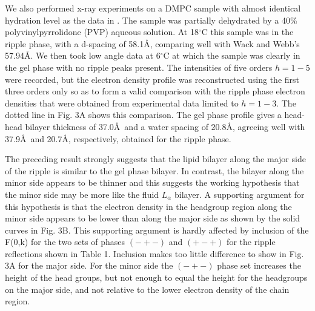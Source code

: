 We also performed x-ray experiments on a DMPC sample with almost identical
hydration level as the data in \cite{Wac89a}. 
The sample was partially dehydrated by a 40\% polyvinylpyrrolidone
(PVP) aqueous solution.  At 18$^{\circ}$C
this sample was in the ripple phase, with a d-spacing of 58.1\AA, comparing 
well with Wack and Webb's 57.94\AA.  We then took
low angle data at 6$^{\circ}$C at which the sample was clearly in the
gel phase with no ripple peaks present. The intensities of five orders 
$h=1-5$ were
recorded, but the electron density profile was reconstructed using
the first three orders only so as to form a valid comparison 
with the ripple phase electron densities that were obtained from 
experimental data limited to $h=1-3$.  
The dotted line in Fig. 3A shows this comparison.
The gel phase profile gives a head-head bilayer thickness of 37.0\AA\ and
a water spacing of 20.8\AA, agreeing well with 37.9\AA\ and 20.7\AA,
respectively, obtained for the ripple phase.

The preceding result strongly suggests that the lipid bilayer along the major
side of the ripple is similar to the gel phase bilayer.
In contrast, the bilayer along the minor side appears to be
thinner and this suggests the working hypothesis that the
minor side may be more like the fluid $L_{\alpha}$ bilayer.
A supporting argument for this hypothesis is that the electron density 
in the headgroup region along the minor side appears to be lower than 
along the major side as shown by the solid curves in Fig. 3B.  
This supporting argument is hardly affected by inclusion of the
F(0,k) for the two sets of phases $(-+-)$ and $(+-+)$ for the ripple 
reflections shown in Table 1.  Inclusion makes too little difference 
to show in Fig. 3A for the major side.  For the minor side the 
$(-+-)$ phase set increases the height of the head groups, but not
enough to equal the height for the headgroups on the
major side, and not relative to the lower electron density of the 
chain region.

